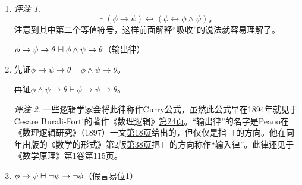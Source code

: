 \documentclass[punct=custom/kaiming,fontset=none]{ctexart}
\makeatletter
\newcommand*{\vdashv}{\mathrel{\ooalign{$\vdash$\cr\hskip1pt\reflectbox{$\vdash$}}}}
\renewenvironment{proof}[1][\proofname]{\par
  \pushQED{\qed}%
  \normalfont \topsep6\p@\@plus6\p@\relax
  \trivlist
  \item[\hskip\labelsep
    \bfseries
    #1%
    ]\ignorespaces
}{%
  \popQED\endtrivlist\@endpefalse
}
\theoremstyle{remark}
\newtheorem*{remark}{评注}
\let\asserts⊦
\let\proves\vdash
\makeatother
\begin{document}
\begin{description}
\begin{enumerate}
\begin{proof}
\begin{remark}
        \begin{equation*}
          \asserts
          (\phi \to \psi)
          \leftrightarrow
          (\phi \leftrightarrow \phi \land \psi)。
        \end{equation*}
        注意到其中第二个等值符号，这样前面解释“吸收”的说法就容易理解了。
      \end{remark}
    \end{proof}
    \(\phi \to \psi \to \theta \vdashv \phi \land \psi \to \theta\)\hfill（\hypertarget{ded:exp}{输出律}）
    \begin{proof}
      先证\(\phi \to \psi \to \theta \proves \phi \land \psi \to \theta\)。
      \begin{ND}
        \label{1}
        \label{2}
        \label{3}
        \label{4}
      \end{ND}
      再证\(\phi \land \psi \to \theta \proves \phi \to \psi \to \theta\)。
      \begin{ND}
        \label{1}
        \label{2}
        \label{3}
      \end{ND}
      \begin{remark}
        一些逻辑学家会将此律称作Curry公式，虽然此公式早在1894年就见于Cesare Burali-Forti的著作《数理逻辑》\href{https://archive.org/details/BuraliFortiLogicaMatematica/page/n28/mode/1up}{第24页}。“输出律”的名字是Peano在《数理逻辑研究》（1897）一文\href{https://archive.org/details/peano-studii-di-logica-matematica/page/18/mode/1up}{第18页}给出的，但仅仅是指\(\dashv\)的方向。他在同年出版的《数学的形式》第2版\href{https://gallica.bnf.fr/ark:/12148/bpt6k84142s/f39.item}{第38页}把\(\vdash\)的方向称作“输入律”。此律还见于《数学原理》第1卷第115页。
      \end{remark}
    \end{proof}
  \item \(\phi \to \psi \vdashv \neg\psi \to \neg\phi\)\hfill（\hypertarget{ded:contrapose1}{假言易位1}）

\end{enumerate}
\end{description}
\end{document}
